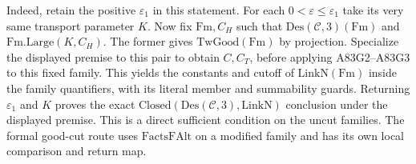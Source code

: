 Indeed, retain the positive $\varepsilon_1$ in this statement.
For each $0<\varepsilon\le\varepsilon_1$ take its very same
transport parameter $K$. Now fix $\mathrm{Fm},C_H$ such that
$\mathrm{Des}(\mathcal C,3)(\mathrm{Fm})$ and
$\mathrm{Fm}.\mathrm{Large}(K,C_H)$. The former gives
$\mathrm{TwGood}(\mathrm{Fm})$ by projection. Specialize the
displayed premise to this pair to obtain $C,C_T$, before applying
A83G2--A83G3 to this fixed family. This yields the constants and
cutoff of $\mathrm{LinkN}(\mathrm{Fm})$ inside the family
quantifiers, with its literal member and summability guards.
Returning $\varepsilon_1$ and $K$ proves the exact
$\mathrm{Closed}(\mathrm{Des}(\mathcal C,3),\mathrm{LinkN})$
conclusion under the displayed premise. This is a direct
sufficient condition on the uncut families. The formal good-cut
route uses $\mathrm{FactsFAlt}$ on a modified family and has its
own local comparison and return map.
